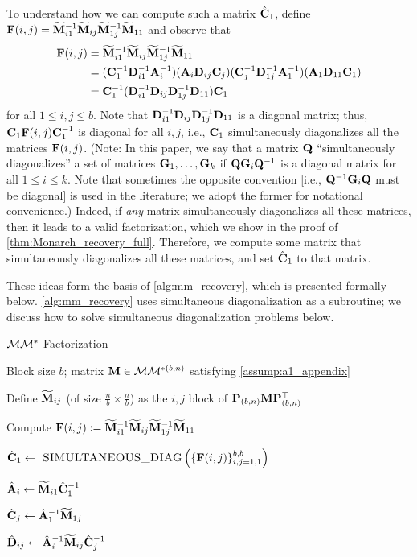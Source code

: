 To understand how we can compute such a matrix $\hat{\mathbf{C}}_1$, define $\mathbf{F}(i, j) = \widetilde{\mathbf{M}}_{i1}^{-1} \widetilde{\mathbf{M}}_{ij} \widetilde{\mathbf{M}}_{1j}^{-1} \widetilde{\mathbf{M}}_{11}$ and observe that
\begin{align*}
\mathbf{F}(i, j) &= \widetilde{\mathbf{M}}_{i1}^{-1} \widetilde{\mathbf{M}}_{ij} \widetilde{\mathbf{M}}_{1j}^{-1} \widetilde{\mathbf{M}}_{11} \\ &=
(\mathbf{C}_1^{-1} \mathbf{D}_{i1}^{-1} \mathbf{A}_i^{-1}) (\mathbf{A}_i \mathbf{D}_{ij} \mathbf{C}_j) (\mathbf{C}_j^{-1} \mathbf{D}_{1j}^{-1} \mathbf{A}_1^{-1}) (\mathbf{A}_1 \mathbf{D}_{11} \mathbf{C}_1) \\
&= \mathbf{C}_1^{-1} (\mathbf{D}_{i1}^{-1} \mathbf{D}_{ij} \mathbf{D}_{1j}^{-1} \mathbf{D}_{11}) \mathbf{C}_1
\end{align*} for all $1 \le i, j \le b$.
Note that $\mathbf{D}_{i1}^{-1} \mathbf{D}_{ij} \mathbf{D}_{1j}^{-1} \mathbf{D}_{11}$ is a diagonal matrix;
thus, $\mathbf{C}_1 \mathbf{F}(i, j) \mathbf{C}_1^{-1}$ is diagonal for all $i, j$, i.e., 
$\mathbf{C}_1$ simultaneously diagonalizes all the matrices $\mathbf{F}(i, j)$.
(Note: In this paper, we say that a matrix $\mathbf{Q}$ ``simultaneously diagonalizes'' a set of matrices $\mathbf{G}_1, \dots, \mathbf{G}_k$ if $\mathbf{Q} \mathbf{G}_i \mathbf{Q}^{-1}$ is a diagonal matrix for all $1 \le i \le k$. Note that sometimes the opposite convention [i.e., $\mathbf{Q}^{-1} \mathbf{G}_i \mathbf{Q}$ must be diagonal] is used in the literature; we adopt the former for notational convenience.)
Indeed, if \emph{any} matrix simultaneously diagonalizes all these matrices, then it leads to a valid factorization, which we show in the proof of \cref{thm:Monarch_recovery_full}. Therefore, we compute some matrix that simultaneously diagonalizes all these matrices, and set $\hat{\mathbf{C}}_1$ to that matrix.

These ideas form the basis of \cref{alg:mm_recovery}, which is presented formally below. \cref{alg:mm_recovery} uses simultaneous diagonalization as a subroutine; we discuss how to solve simultaneous diagonalization problems below.

\begin{algorithm}[H]
\caption{$\mathcal{M}\mathcal{M}^*$ Factorization}
\label{alg:mm_recovery}
\begin{algorithmic}[1]
\REQUIRE Block size $b$; matrix $\mathbf{M} \in \mathcal{M}\mathcal{M}^{*(b,n)}$ satisfying \cref{assump:a1_appendix}
\item Define $\widetilde{\mathbf{M}}_{ij}$ (of size $\frac{n}{b} \times \frac{n}{b}$) as the $i,j$ block of $\mathbf{P}_{(b,n)} \mathbf{M} \mathbf{P}_{(b,n)}^\top$
\item Compute $\mathbf{F}(i,j) := \widetilde{\mathbf{M}}_{i1}^{-1}\widetilde{\mathbf{M}}_{ij}\widetilde{\mathbf{M}}_{1j}^{-1}\widetilde{\mathbf{M}}_{11}$
\ENDFOR
\item $\hat{\vC}_1 \leftarrow \ \textsc{SIMULTANEOUS\_DIAG}\lt \{\vF(i,j)\}_{i,j=1,1}^{b,b}\rt $
\item $\hat{\mathbf{A}}_i \leftarrow \widetilde{\mathbf{M}}_{i1} \hat{\mathbf{C}}_1^{-1}$
\ENDFOR
{}
\item $\hat{\mathbf{C}}_j \leftarrow \hat{\mathbf{A}}_1^{-1} \widetilde{\mathbf{M}}_{1j}$
\ENDFOR
{}
\item $\hat{\mathbf{D}}_{ij} \leftarrow \hat{\mathbf{A}}_i^{-1} \widetilde{\mathbf{M}}_{ij}\hat{\mathbf{C}}_j^{-1}$
\ENDFOR
\end{algorithmic}
\end{algorithm}

